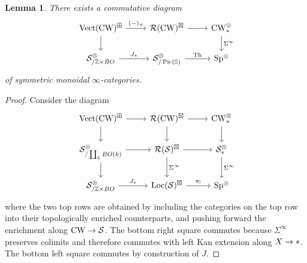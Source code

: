 \documentclass[10pt]{amsart}
\numberwithin{equation}{section}
\newtheorem{lem}[prop]{Lemma}
\theoremstyle{definition}
\DeclareMathOperator{\Pic}{Pic}
\DeclareMathOperator{\Th}{Th}
\DeclareMathOperator{\Vect}{Vect}
\DeclareMathOperator{\Loc}{Loc}
\DeclareMathOperator{\CW}{CW}
\newcommand{\bS}{\mathbb{S}}
\newcommand{\bZ}{\mathbb{Z}}
\newcommand{\cS}{\mathcal{S}}
\newcommand{\cR}{\mathcal{R}}
\newcommand{\Sp}{\mathrm{Sp}\vphantom{p}}
\renewcommand{\to}{\mathchoice{\longrightarrow}{\rightarrow}{}{}}
\begin{document}
\begin{lem}\label{lem:J_hom}
	There exists a commutative diagram
	\begin{equation*}
		\begin{tikzcd}
			\Vect(\CW)^{\boxplus} \arrow[r, "(-)_{+}"] \arrow[d]      &  \cR(\CW)^{\boxtimes}  \arrow[r] & \CW_{\ast}^{\otimes} \arrow[d, "\Sigma^{\infty}"] \\
			\cS_{/ \bZ\times BO}^{\otimes}  \arrow[r, "J_{*}"]               &   \cS_{/\Pic(\bS)}^{\otimes}  \arrow[r, "\Th"]            & \Sp^{\otimes}
		\end{tikzcd}
	\end{equation*}
  of symmetric monoidal $\infty$-categories.
\end{lem}

\begin{proof}
	Consider the diagram
	\begin{equation*}
		\begin{tikzcd}
			\Vect(\CW)^{\boxplus} \arrow[r] \arrow[d]      &   \cR(\CW)^{\boxtimes}  \arrow[d]  \arrow[r] & \CW_{\ast}^{\otimes} \arrow[d] \\
			\cS_{/\coprod_{k} BO(k)}^{\otimes}  \arrow[r]  \arrow[d]             &  \cR(\cS)^{\boxtimes} \arrow[r]  \arrow[d ,"\Sigma^{\infty}"]          &  \cS_{*}^{\otimes} \arrow[d,"\Sigma^{\infty}"] \\
			\cS_{/\bZ\times BO}^{\otimes} \arrow[r, "J_{*}"] & \Loc(\cS)^{\boxtimes} \arrow[r, "\pi_{!}"] & \Sp^{\otimes}
		\end{tikzcd}
	\end{equation*}
  where the two top rows are obtained by including the categories on the top row into their topologically enriched counterparts, and pushing forward the enrichment along $\CW \to \cS$.
	The bottom right square commutes because $\Sigma^{\infty}$ preserves colimits and therefore commutes with left Kan extension along $X\to \ast$.
  The bottom left square commutes by construction of $J$.
\end{proof}
\end{document}
